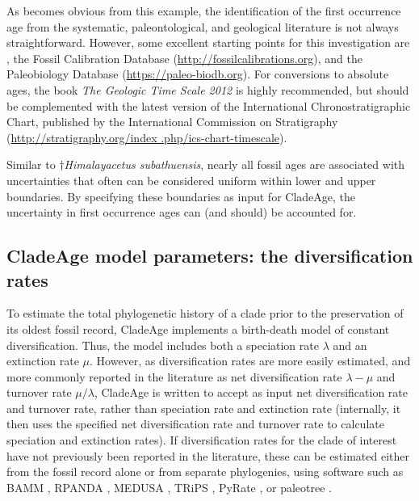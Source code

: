 \documentclass{article}
\begin{document}
As becomes obvious from this example, the identification of the first occurrence age from the systematic, paleontological, and geological literature is not always straightforward. However, some excellent starting points for this investigation are \citet{Benton:2015wj}, the Fossil Calibration Database (\href{http://fossilcalibrations.org}{http://fossilcalibrations.org}), and the Paleobiology Database (\href{https://paleobiodb.org}{https://paleo-\linebreak biodb.org}). For conversions to absolute ages, the book \emph{The Geologic Time Scale 2012} \citep{Gradstein:2012ur} is highly recommended, but should be complemented with the latest version of the International Chronostratigraphic Chart, published by the International Commission on Stratigraphy (\href{http://stratigraphy.org/index.php/ics-chart-timescale}{http://stratigraphy.org/index .php/ics-chart-timescale}).

Similar to $\dagger$\textit{Himalayacetus subathuensis}, nearly all fossil ages are associated with uncertainties that often can be considered uniform within lower and upper boundaries. By specifying these boundaries as input for CladeAge, the uncertainty in first occurrence ages can (and should) be accounted for.

\subsection{CladeAge model parameters: the diversification rates}\label{diversification_rates}

To estimate the total phylogenetic history of a clade prior to the preservation of its oldest fossil record, CladeAge implements a birth-death model of constant diversification. Thus, the model includes both a speciation rate $\lambda$ and an extinction rate $\mu$. However, as diversification rates are more easily estimated, and more commonly reported in the literature as net diversification rate $\lambda - \mu$ and turnover rate $\mu / \lambda$, CladeAge is written to accept as input net diversification rate and turnover rate, rather than speciation rate and extinction rate (internally, it then uses the specified net diversification rate and turnover rate to calculate speciation and extinction rates). If diversification rates for the clade of interest have not previously been reported in the literature, these can be estimated either from the fossil record alone or from separate phylogenies, using software such as BAMM \citep{Rabosky:2014ba}, RPANDA \citep{Morlon:2015jm}, MEDUSA \citep{Alfaro:2009vc}, TRiPS \citep{Starrfelt:2016en}, PyRate \citep{Silvestro:2014ga}, or paleotree \citep{Bapst:2012hg}.
\end{document}
